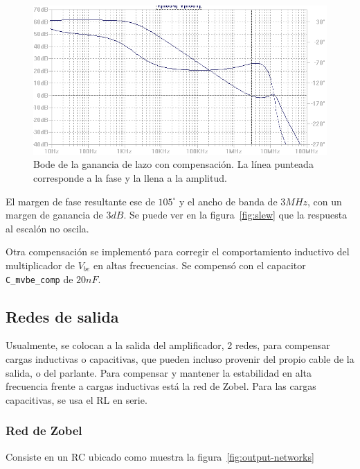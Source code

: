 \documentclass[a4paper,12pt,twoside]{article}
\begin{document}
\begin{figure}[H]
	\centering
	\includegraphics[height=0.4\textwidth]{img/sim/bode-la-con-comp}
	\caption{Bode de la ganancia de lazo con compensación. La línea punteada corresponde a la fase y la llena a la amplitud.}
	\label{fig:bode-la-con-comp}
\end{figure}


El margen de fase resultante ese de $105^{\circ}$ y el ancho de banda de $3MHz$, con un margen de ganancia de $3dB$. Se puede ver en la figura~\ref{fig:slew} que la respuesta al escalón no oscila.

Otra compensación se implementó para corregir el comportamiento inductivo del multiplicador de $V_{be}$ en altas frecuencias. Se compensó con el capacitor \texttt{C\_mvbe\_comp} de $20nF$.

\subsection{Redes de salida}

Usualmente, se colocan a la salida del amplificador, 2 redes, para compensar cargas inductivas o capacitivas, que pueden incluso provenir del propio cable de la salida, o del parlante. Para compensar y mantener la estabilidad en alta frecuencia frente a cargas inductivas está la red de Zobel. Para las cargas capacitivas, se usa el RL en serie.

\subsubsection{Red de Zobel}

Consiste en un RC ubicado como muestra la figura~\ref{fig:output-networks}
\end{document}
